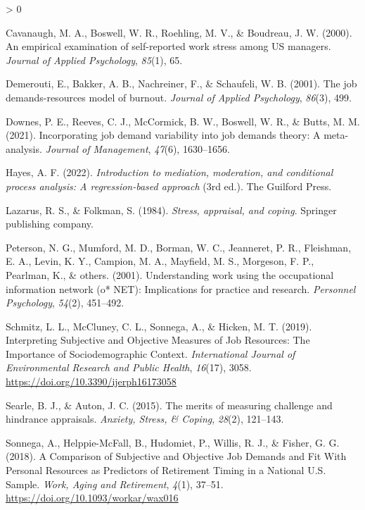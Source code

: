 \documentclass[
  english,
  man]{apa6}
\newlength{\cslhangindent}
\newenvironment{CSLReferences}[2] %
 {%
  \setlength{\parindent}{0pt}
  \ifodd #1 \everypar{\setlength{\hangindent}{\cslhangindent}}\ignorespaces\fi
  \ifnum #2 > 0
  \setlength{\parskip}{#2\baselineskip}
  \fi
 }%
 {}
\begin{document}
\begin{CSLReferences}{1}{0}
\leavevmode\hypertarget{ref-cavanaugh2000empirical}{}%
Cavanaugh, M. A., Boswell, W. R., Roehling, M. V., \& Boudreau, J. W. (2000). An empirical examination of self-reported work stress among US managers. \emph{Journal of Applied Psychology}, \emph{85}(1), 65.

\leavevmode\hypertarget{ref-demerouti2001job}{}%
Demerouti, E., Bakker, A. B., Nachreiner, F., \& Schaufeli, W. B. (2001). The job demands-resources model of burnout. \emph{Journal of Applied Psychology}, \emph{86}(3), 499.

\leavevmode\hypertarget{ref-downes2021incorporating}{}%
Downes, P. E., Reeves, C. J., McCormick, B. W., Boswell, W. R., \& Butts, M. M. (2021). Incorporating job demand variability into job demands theory: A meta-analysis. \emph{Journal of Management}, \emph{47}(6), 1630--1656.

\leavevmode\hypertarget{ref-hayes2022}{}%
Hayes, A. F. (2022). \emph{Introduction to mediation, moderation, and conditional process analysis: A regression-based approach} (3rd ed.). The Guilford Press.

\leavevmode\hypertarget{ref-lazarus1984stress}{}%
Lazarus, R. S., \& Folkman, S. (1984). \emph{Stress, appraisal, and coping}. Springer publishing company.

\leavevmode\hypertarget{ref-peterson2001understanding}{}%
Peterson, N. G., Mumford, M. D., Borman, W. C., Jeanneret, P. R., Fleishman, E. A., Levin, K. Y., Campion, M. A., Mayfield, M. S., Morgeson, F. P., Pearlman, K., \& others. (2001). Understanding work using the occupational information network (o* NET): Implications for practice and research. \emph{Personnel Psychology}, \emph{54}(2), 451--492.

\leavevmode\hypertarget{ref-schmitz_interpreting_2019}{}%
Schmitz, L. L., McCluney, C. L., Sonnega, A., \& Hicken, M. T. (2019). Interpreting {Subjective} and {Objective} {Measures} of {Job} {Resources}: {The} {Importance} of {Sociodemographic} {Context}. \emph{International Journal of Environmental Research and Public Health}, \emph{16}(17), 3058. \url{https://doi.org/10.3390/ijerph16173058}

\leavevmode\hypertarget{ref-searle2015merits}{}%
Searle, B. J., \& Auton, J. C. (2015). The merits of measuring challenge and hindrance appraisals. \emph{Anxiety, Stress, \& Coping}, \emph{28}(2), 121--143.

\leavevmode\hypertarget{ref-sonnega_comparison_2018}{}%
Sonnega, A., Helppie-McFall, B., Hudomiet, P., Willis, R. J., \& Fisher, G. G. (2018). A {Comparison} of {Subjective} and {Objective} {Job} {Demands} and {Fit} {With} {Personal} {Resources} as {Predictors} of {Retirement} {Timing} in a {National} {U}.{S}. {Sample}. \emph{Work, Aging and Retirement}, \emph{4}(1), 37--51. \url{https://doi.org/10.1093/workar/wax016}


\end{CSLReferences}
\end{document}
